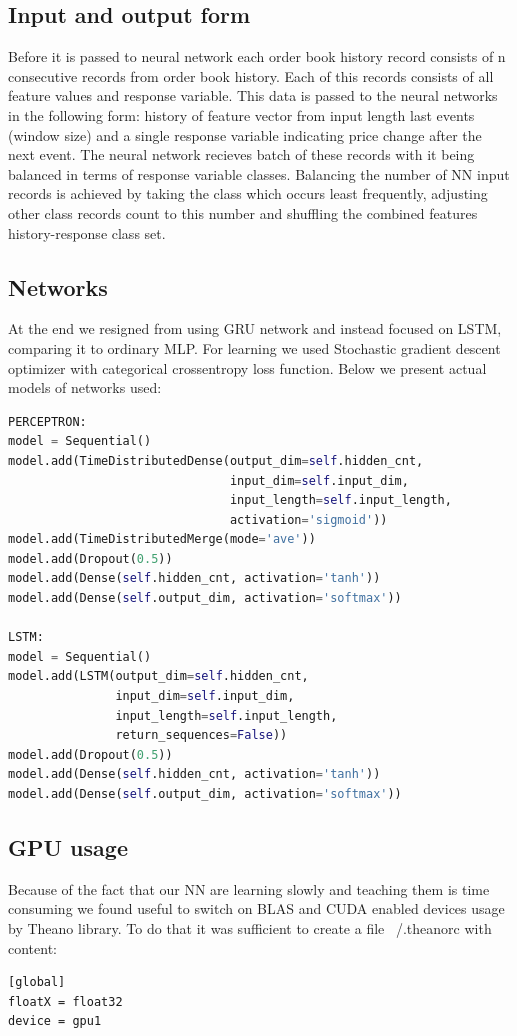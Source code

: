 \documentclass[twoside]{article}
\begin{document}
\begin{multicols}{2}
\subsection{Input and output form}
Before it is passed to neural network each order book history record consists of n consecutive records from order book history. Each of this records consists of all feature values and response variable.
This data is passed to the neural networks in the following form: history of feature vector from input length last events (window size) and a single response variable indicating price change after the next event. The neural network recieves batch of these records with it being balanced in terms of response variable classes.
Balancing the number of NN input records is achieved by taking the class which occurs least frequently, adjusting other class records count to this number and shuffling the combined features history-response class set.
\subsection{Networks}
At the end we resigned from using GRU network and instead focused on LSTM, comparing it to ordinary MLP.
For learning we used Stochastic gradient descent optimizer with categorical crossentropy loss function.
Below we present actual models of networks used:
\begin{lstlisting}[language=Python, frame=single, basicstyle=\tiny]
PERCEPTRON:
model = Sequential()
model.add(TimeDistributedDense(output_dim=self.hidden_cnt,
                               input_dim=self.input_dim,
                               input_length=self.input_length,
                               activation='sigmoid'))
model.add(TimeDistributedMerge(mode='ave'))
model.add(Dropout(0.5))
model.add(Dense(self.hidden_cnt, activation='tanh'))
model.add(Dense(self.output_dim, activation='softmax'))

LSTM:
model = Sequential()
model.add(LSTM(output_dim=self.hidden_cnt,
			   input_dim=self.input_dim,
			   input_length=self.input_length,
			   return_sequences=False))
model.add(Dropout(0.5))
model.add(Dense(self.hidden_cnt, activation='tanh'))
model.add(Dense(self.output_dim, activation='softmax'))
\end{lstlisting}

\subsection{GPU usage}
Because of the fact that our NN are learning slowly and teaching them is time consuming we found
useful to switch on BLAS and CUDA enabled devices usage by Theano library. To do that it was sufficient to
create a file ~/.theanorc with content: \\
\begin{lstlisting}
[global]
floatX = float32
device = gpu1


\end{lstlisting}
\end{multicols}
\end{document}
